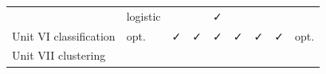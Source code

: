 \documentclass[11pt]{article}
\begin{document}
{\begin{longtable}[]{@{}lllllllll@{}}
\begin{minipage}[t]{0.08\columnwidth}
\end{minipage} & \begin{minipage}[t]{0.08\columnwidth}\raggedright
logistic\strut
\end{minipage} & \begin{minipage}[t]{0.08\columnwidth}\raggedright
\strut
\end{minipage} & \begin{minipage}[t]{0.08\columnwidth}\raggedright
\strut
\end{minipage} & \begin{minipage}[t]{0.08\columnwidth}\raggedright
✓\strut
\end{minipage}\tabularnewline
\begin{minipage}[t]{0.08\columnwidth}\raggedright
Unit VI classification\strut
\end{minipage} & \begin{minipage}[t]{0.08\columnwidth}\raggedright
opt.\strut
\end{minipage} & \begin{minipage}[t]{0.08\columnwidth}\raggedright
✓\strut
\end{minipage} & \begin{minipage}[t]{0.08\columnwidth}\raggedright
✓\strut
\end{minipage} & \begin{minipage}[t]{0.08\columnwidth}\raggedright
✓\strut
\end{minipage} & \begin{minipage}[t]{0.08\columnwidth}\raggedright
✓\strut
\end{minipage} & \begin{minipage}[t]{0.08\columnwidth}\raggedright
✓\strut
\end{minipage} & \begin{minipage}[t]{0.08\columnwidth}\raggedright
✓\strut
\end{minipage} & \begin{minipage}[t]{0.08\columnwidth}\raggedright
opt.\strut
\end{minipage}\tabularnewline
\begin{minipage}[t]{0.08\columnwidth}\raggedright
Unit VII clustering\strut
\end{minipage} & \begin{minipage}[t]{0.08\columnwidth}\raggedright
\strut
\end{minipage} & \begin{minipage}[t]{0.08\columnwidth}\raggedright
\strut
\end{minipage} & \begin{minipage}[t]{0.08\columnwidth}\raggedright

\end{minipage}
\end{longtable}}
\end{document}
